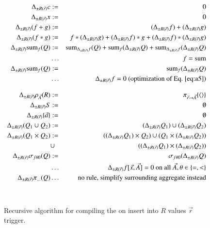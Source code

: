 \documentclass{article}
\newcommand{\tuple}[1]{{\langle#1\rangle}}
\begin{document}
\begin{figure*}
\begin{eqnarray}
\label{eq:a1}
\Delta_{\pm R(\vec{r})} c       &:=& 0 \\
\label{eq:a2}
\Delta_{\pm R(\vec{r})} x       &:=& 0 \\
\label{eq:a3}
\Delta_{\pm R(\vec{r})} (f + g) &:=& (\Delta_{\pm R(\vec{r})} f) + (\Delta_{\pm R(\vec{r})} g) \\
\label{eq:a4}
\Delta_{\pm R(\vec{r})} (f * g) &:=&         f                * (\Delta_{\pm R(\vec{r})} g)
                              +   (\Delta_{\pm R(\vec{r})} f) * g                        
                              +   (\Delta_{\pm R(\vec{r})} f) * (\Delta_{\pm R(\vec{r})} g)
\\
\label{eq:a5}
\Delta_{\pm R(\vec{r})} \algsum_f(Q) &:=&
   \algsum_{\Delta_{\pm R(\vec{r})} f}(Q)
   + \algsum_f(\Delta_{\pm R(\vec{r})} Q)
   + \algsum_{\Delta_{\pm R(\vec{r})} f}(\Delta_{\pm R(\vec{r})} Q)
\\
\nonumber
&\dots& \mbox{$f = \algsum$}
\\
\label{eq:a6}
\Delta_{\pm R(\vec{r})} \algsum_f(Q) &:=&
   \algsum_f(\Delta_{\pm R(\vec{r})} Q)
\\
\nonumber
&\dots& \mbox{$\Delta_{\pm R(\vec{r})} f = 0$ (optimization of Eq.~\ref{eq:a5})}
%
%
\\[2ex]
\label{eq:b1}
\Delta_{\pm R(\vec{r})} \rho_{\vec{A}}(R) &:=& \pi_{\vec{r} \rightarrow \vec{A}}\{\tuple{}\}
\\
\label{eq:b2}
\Delta_{\pm R(\vec{r})} S &:=& \emptyset
\\
\label{eq:b3}
\Delta_{\pm R(\vec{r})} \{ \vec{a} \} &:=& \emptyset 
\\
\label{eq:b4}
\Delta_{\pm R(\vec{r})} (Q_1 \cup Q_2) &:=&
(\Delta_{\pm R(\vec{r})} Q_1) \cup (\Delta_{\pm R(\vec{r})} Q_2)
\\
\label{eq:b5}
\Delta_{\pm R(\vec{r})} (Q_1 \times Q_2) &:=&
((\Delta_{\pm R(\vec{r})} Q_1) \times Q_2) \cup
(Q_1 \times (\Delta_{\pm R(\vec{r})} Q_2)) \\
\nonumber
&\cup&
((\Delta_{\pm R(\vec{r})} Q_1) \times (\Delta_{\pm R(\vec{r})} Q_2))
\\
\label{eq:b6}
\Delta_{\pm R(\vec{r})} \sigma_{f \theta 0}(Q) &:=&
\sigma_{f \theta 0}(\Delta_{\pm R(\vec{r})} Q)
\\
\nonumber
&\dots& \Delta_{\pm R(\vec{r})} f[\vec{x}, \vec{A}] = 0 \mbox{ on all $\vec{A}$}, \theta \in \{=,<\}
\\
\nonumber
\Delta_{\pm R(\vec{r})} \pi_{\dots}(Q) &\dots& \mbox{no rule, simplify 
surrounding aggregate instead}
\\[2ex] \nonumber
%
%
\end{eqnarray}

\vspace{-4mm}

\caption{Recursive algorithm for compiling the
on insert into $R$ values $\vec{r}$ trigger.}
\label{fig:mainalg}
\end{figure*}
\end{document}
